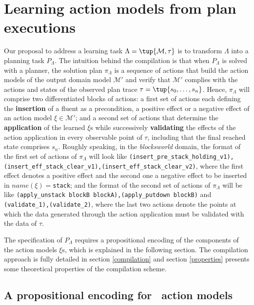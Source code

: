 
\section{Learning action models from plan executions}
\label{sec:learning}

\textcolor[rgb]{1.00,0.00,0.00}{Our proposal to address a learning task $\Lambda=\tup{\mathcal{M},\tau}$ is to transform $\Lambda$ into a planning task $P_{\Lambda}$. The intuition behind the compilation is that when $P_{\Lambda}$ is solved with a planner, the solution plan $\pi_\Lambda$ is a sequence of actions that build the action models of the output domain model $\mathcal{M'}$ and verify that $\mathcal{M'}$ complies with the actions and states of the observed plan trace $\tau = \tup {s_0, \ldots, s_n}$. Hence, $\pi_\Lambda$ will comprise two differentiated blocks of actions: a first set of actions each defining the \textbf{insertion} of a fluent as a precondition, a positive effect or a negative effect of an action model $\xi \in \mathcal{M'}$; and a second set of actions that determine the \textbf{application} of the learned $\xi$s while successively \textbf{validating} the effects of the action application in every observable point of $\tau$, including that the final reached state comprises $s_n$. Roughly speaking, in the \emph{blocksworld} domain, the format of the first set of actions of $\pi_\Lambda$ will look like {\tt{\small (insert\_pre\_stack\_holding\_v1),(insert\_eff\_stack\_clear\_v1),(insert\_eff\_stack\_clear\_v2)}}, where the first effect denotes a positive effect and the second one a negative effect to be inserted in $name(\xi)=${\tt{\small stack}}; and the format of the second set of actions of $\pi_\Lambda$ will be like {\tt{\small (apply\_unstack blockB blockA),(apply\_putdown blockB)}} and {\tt{\small (validate\_1),(validate\_2)}}, where the last two actions denote the points at which the data generated through the action application must be validated with the data of $\tau$.}

\vspace{0.1cm}

The specification of $P_{\Lambda}$ requires a propositional encoding of the components of the action models $\xi$s, which is explained in the following section. The compilation approach is fully detailed in section \ref{compilation} and section \ref{properties} presents some theoretical properties of the compilation scheme.




\subsection{A propositional encoding for \strips\ action models}
\label{propositional_encoding}


